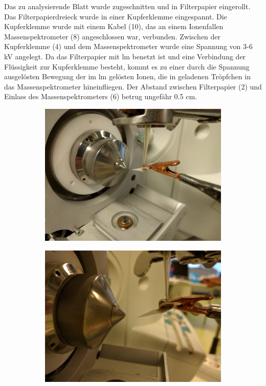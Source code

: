 \documentclass[12pt,a4paper]{article}
\begin{document}
Das zu analysierende Blatt wurde zugeschnitten und in Filterpapier eingerollt. Das Filterpapierdreieck wurde in einer Kupferklemme eingespannt. Die Kupferklemme wurde mit einem Kabel (10), das an einem Ionenfallen Massenspektrometer (8) angeschlossen war, verbunden. Zwischen der Kupferklemme (4) und dem Massenspektrometer wurde eine Spannung von 3-6 kV angelegt. Da das Filterpapier mit \gls{lm} benetzt ist und eine Verbindung der Flüssigkeit zur Kupferklemme besteht, kommt es zu einer durch die Spannung ausgelösten Bewegung der im \gls{lm} gelösten Ionen, die in geladenen Tröpfchen in das Massenspektrometer hineinfliegen. Der Abstand zwischen Filterpapier (2) und Einlass des Massenspektrometers (6) betrug ungefähr 0.5 cm.

\begin{figure}[htbp]
  \begin{subfigure}[b]{0.5\textwidth}
    \includegraphics[width=\textwidth]{figures/Kapitel4/VWA_MSLeafspray_Detail1.jpg}
    \caption{}
    \label{fig:MSLeafsprayDetail1}
  \end{subfigure}
  \hfill
  \begin{subfigure}[b]{0.5\textwidth}
    \includegraphics[width=\textwidth]{figures/Kapitel4/VWA_MSLeafspray_Detail2.jpg}

\end{subfigure}
\end{figure}
\end{document}
